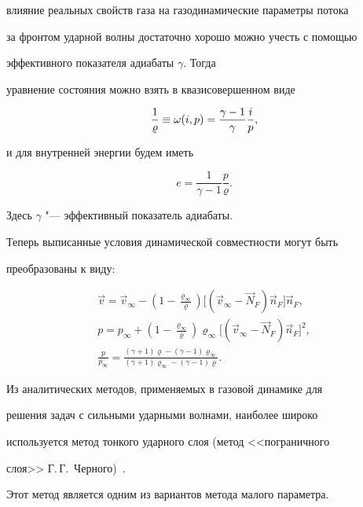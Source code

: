 влияние реальных свойств газа на газодинамические параметры потока


за фронтом ударной волны достаточно хорошо можно учесть с помощью


эффективного показателя адиабаты $\gamma$\cite{Lunev}. Тогда


уравнение состояния можно взять в квазисовершенном виде


$$ \frac{1}{\varrho} \equiv \omega(i,  p) = {\gamma - 1\over\gamma} {i\over p},  $$


и для внутренней энергии  будем иметь


$$ e=\frac{1}{\gamma - 1} \frac{p}{\varrho}.$$


Здесь $\gamma$ "--- эффективный показатель адиабаты.





Теперь выписанные условия динамической совместности могут быть


преобразованы к виду:


\begin{eqnarray}


\vec v =\vec v_\infty


-(1-\frac{\varrho_\infty}{\varrho})\bigl[(\vec


v_\infty - \vec N_F) \vec n_F\bigr] \vec n_F,  \nonumber\\


 p=p_\infty+(1-\frac{\varrho_\infty}{\varrho}) \varrho_\infty \bigl[(\vec v_\infty -\vec N_F)


\vec n_F\bigr]^2,  \\


{\frac{p}{p_\infty} = \frac{(\gamma+1) \varrho-(\gamma-1) \varrho_\infty}{


(\gamma+1) \varrho_\infty-(\gamma-1) \varrho}}.  \quad \nonumber


\end{eqnarray}





Из аналитических методов,  применяемых в газовой динамике для


решения задач с сильными ударными волнами,  наиболее широко


используется метод тонкого ударного слоя (метод <<пограничного


слоя>> Г.\,Г.~Черного)~\cite{Chernii}.





Этот метод является одним из вариантов метода малого параметра.


